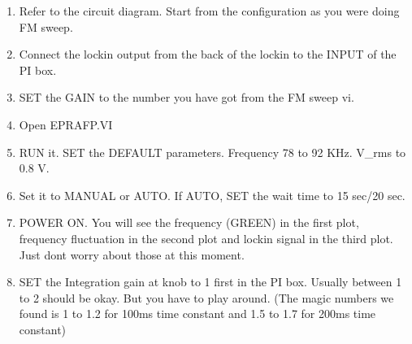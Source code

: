 {\begin{enumerate}
%
%

\item Refer to the circuit diagram. Start from the configuration as you were 
doing FM sweep.

\item Connect the lockin output from the back of the lockin to the INPUT of the PI box.

\item SET the GAIN to the number you have got from the FM sweep vi.

\item Open EPRAFP.VI

\item RUN it. SET the DEFAULT parameters. Frequency 78 to 92 KHz. 
V\_rms to 0.8 V.

\item Set it to MANUAL or AUTO. If AUTO, SET the wait time to 15 sec/20 sec.

\item POWER ON. You will see the frequency (GREEN) in the first plot, frequency fluctuation in the second plot and lockin signal in the third plot. Just dont worry about those at this moment.

\item SET the Integration gain at knob to 1 first in the PI box. Usually between 1 to 2 should be okay. But you have to play around. (The magic numbers we found is 1 to 1.2 for 100ms time constant and 1.5 to 1.7 for 200ms time constant)


\end{enumerate}}
